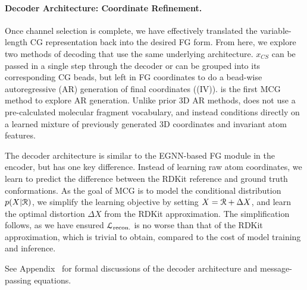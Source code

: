 \paragraph{Decoder Architecture: Coordinate Refinement.}
Once channel selection is complete, we have effectively translated the variable-length CG representation back into the desired FG form. From here, we explore two methods of decoding that use the same underlying architecture. $x_{CS}$ can be passed in a single step through the decoder or can be grouped into its corresponding CG beads, but left in FG coordinates to do a bead-wise autoregressive (AR) generation of final coordinates ((IV)). \model is the first MCG method to explore AR generation. Unlike prior 3D AR methods, \model does not use a pre-calculated molecular fragment vocabulary, and instead conditions directly on a learned mixture of previously generated 3D coordinates and invariant atom features. 

The decoder architecture is similar to the EGNN-based FG module in the encoder, but has one key difference. 
Instead of learning raw atom coordinates, we learn to predict the difference between the RDKit reference and ground truth conformations.  As the goal of MCG is to model the conditional distribution $p(X | {\mathcal{R}})$, we simplify the learning objective by setting $X = {\mathcal{R}} + \Delta X$, and learn the optimal distortion $\Delta X$ from the RDKit approximation. 
The simplification follows, as we have ensured ${\mathcal{L}}_{\text{recon.}}$ is no worse than that of the RDKit approximation, which is trivial to obtain, compared to the cost of model training and inference.

See Appendix~ for formal discussions of the decoder architecture and message-passing equations.
